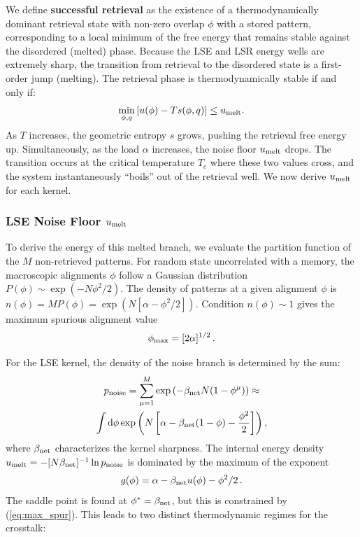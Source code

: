 \documentclass{article}
\newcommand{\dd}{{\mathrm{d}}}
\theoremstyle{plain}
\theoremstyle{definition}
\theoremstyle{remark}
\begin{document}
We define \textbf{successful retrieval} as the existence of a thermodynamically dominant retrieval state with non-zero overlap $\phi$ with a stored pattern, corresponding to a local minimum of the free energy that remains stable against the disordered (melted) phase.
Because the LSE and LSR energy wells are extremely sharp, the transition from retrieval to the disordered state is a first-order jump (melting). The retrieval phase is thermodynamically stable if and only if:
\begin{equation}
    \min_{\phi, q} \left[ u(\phi) - T s(\phi, q) \right] \leq u_{\rm melt}.
\end{equation}
As $T$ increases, the geometric entropy $s$ grows, pushing the retrieval free energy up. Simultaneously, as the load $\alpha$ increases, the noise floor $u_{\rm melt}$ drops. The transition occurs at the critical temperature $T_c$ where these two values cross, and the system instantaneously ``boils'' out of the retrieval well. We now derive $u_{\rm melt}$ for each kernel.


\subsubsection{LSE Noise Floor $u_{\rm melt}$}

To derive the energy of this melted branch, we evaluate the partition function of the $M$ non-retrieved patterns. For random state  uncorrelated with a memory, the macroscopic alignments $\phi$ follow a Gaussian distribution $P(\phi) \sim \exp(-N\phi^2/2)$. The density of patterns at a given alignment $\phi$ is $n(\phi) = M P(\phi) = \exp(N[\alpha - \phi^2/2])$. Condition $n(\phi) \sim 1$ gives the maximum spurious alignment value 
\begin{equation}
    \phi_{\rm max} = [2\alpha]^{1/2}\,.
    \label{eq:max_spur}
\end{equation}

For the LSE kernel, the density of the noise branch is determined by the sum:
\begin{multline}
    p_{\rm noise} = \sum_{\mu=1}^{M} \exp\left( -\beta_{\rm net} N (1 - \phi^\mu) \right) \approx \\
    \int \dd\phi \exp\left( N \left[ \alpha - \beta_{\rm net}(1 - \phi) - \frac{\phi^2}{2} \right] \right),
\end{multline}
where $\beta_{\rm net}$ characterizes the kernel sharpness. The internal energy density $u_{\rm melt} = - [{N\beta_{\rm net}}]^{-1} \ln p_{\rm noise}$ is dominated by the maximum of the exponent 
\begin{equation}
    g(\phi) = \alpha - \beta_{\rm net} u(\phi) - \phi^2/2\,.
    \label{eq:g_phi}
\end{equation}
The saddle point is found at $\phi^* = \beta_{\rm net}$, but this is constrained by (\ref{eq:max_spur}). This leads to two distinct thermodynamic regimes for the crosstalk:
\end{document}
